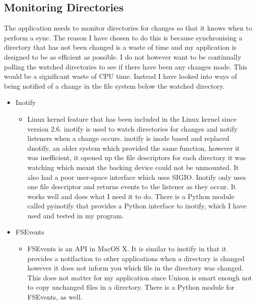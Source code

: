 \documentclass[12pt]{article}
\begin{document}
\subsection{Monitoring Directories}
The application needs to monitor directories for changes
so that it knows when to perform a sync. The reason I have
chosen to do this is because synchronising a directory that
has not been changed is a waste of time and my application
is designed to be as efficient as possible. I do not
however want to be continually polling the watched
directories to see if there have been any changes made.
This would be a significant waste of CPU time. Instead
I have looked into ways of being notified of a
change in the file system below the watched directory.
\begin{itemize}
    \item Inotify
        \begin{itemize}
        \item Linux kernel feature that has been
        included in the Linux kernel since version 2.6.
        inotify is used to watch directories for changes
        and notify listeners when a change occurs. inotify
        is inode based and replaced dnotify, an older system
        which provided the same function, however it was
        inefficient, it opened up the file descriptors for
        each directory it was watching which meant the backing
        device could not be unmounted. 
It also had a poor
        user-space interface which uses SIGIO. Inotify only
        uses one file descriptor and returns events to the
        listener as they occur. It works well and does
        what I need it to do. There is a Python module
        called pyinotify that provides a Python interface
        to inotify, which I have used and tested in my program.
        \end{itemize}

    \item FSEvents
        \begin{itemize}
        \item FSEvents is an API in MacOS X. It is similar
        to inotify in that it provides a notifaction to other
        applications when a directory is changed however
        it does not inform you which file in the directory
        was changed. This does not matter for my
        application since Unison is smart enough not to copy
        unchanged files in a directory. There is a Python module
        for FSEvents, as well. 
        

\end{itemize}
\end{itemize}
\end{document}
